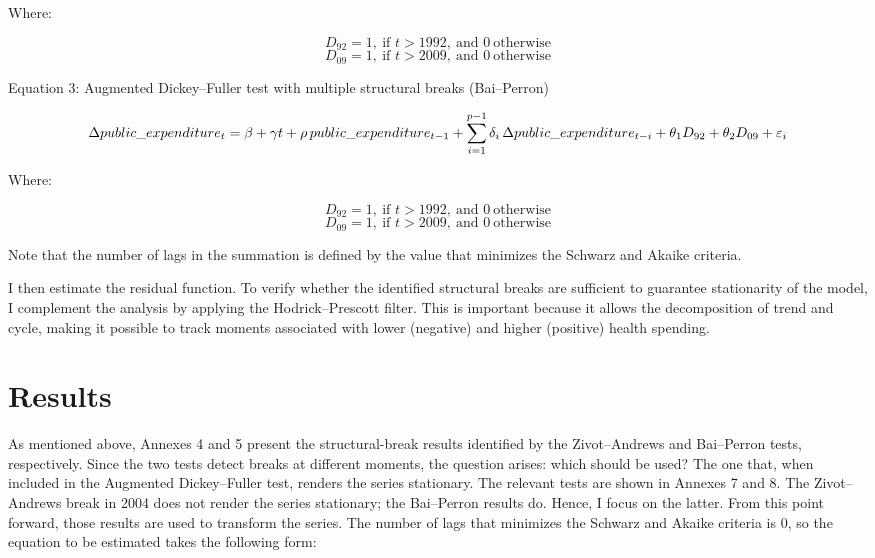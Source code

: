 \documentclass[12pt]{article}
\begin{document}
\bigskip
\bigskip
\bigskip
\bigskip

\begin{center}
Where:
\end{center}
\begin{equation*}
D_{92}=1,\ \text{if } t>1992,\ \text{and } 0\ \text{otherwise}
\end{equation*}
\begin{equation*}
D_{09}=1,\ \text{if } t>2009,\ \text{and } 0\ \text{otherwise}
\end{equation*}

\bigskip
\begin{center}
Equation 3: Augmented Dickey–Fuller test with multiple structural breaks (Bai–Perron)
\end{center}
\begin{equation}
\small
\Delta public\_expenditure_{t} = \beta + \gamma t + \rho \, public\_expenditure_{t-1} + \sum_{i=1}^{p-1} \delta_{i} \, \Delta public\_expenditure_{t-i} + \theta_{1} D_{92} + \theta_{2} D_{09} + \varepsilon_{i}
\end{equation}
\begin{center}
Where:
\end{center}
\begin{equation*}
D_{92}=1,\ \text{if } t>1992,\ \text{and } 0\ \text{otherwise}
\end{equation*}
\begin{equation*}
D_{09}=1,\ \text{if } t>2009,\ \text{and } 0\ \text{otherwise}
\end{equation*}

Note that the number of lags in the summation is defined by the value that minimizes the Schwarz and Akaike criteria.

I then estimate the residual function. To verify whether the identified structural breaks are sufficient to guarantee stationarity of the model, I complement the analysis by applying the Hodrick–Prescott filter. This is important because it allows the decomposition of trend and cycle, making it possible to track moments associated with lower (negative) and higher (positive) health spending.

\section{Results}

As mentioned above, Annexes 4 and 5 present the structural-break results identified by the Zivot–Andrews and Bai–Perron tests, respectively. Since the two tests detect breaks at different moments, the question arises: which should be used? The one that, when included in the Augmented Dickey–Fuller test, renders the series stationary. The relevant tests are shown in Annexes 7 and 8. The Zivot–Andrews break in 2004 does not render the series stationary; the Bai–Perron results do. Hence, I focus on the latter. From this point forward, those results are used to transform the series.
The number of lags that minimizes the Schwarz and Akaike criteria is 0, so the equation to be estimated takes the following form:
\end{document}
